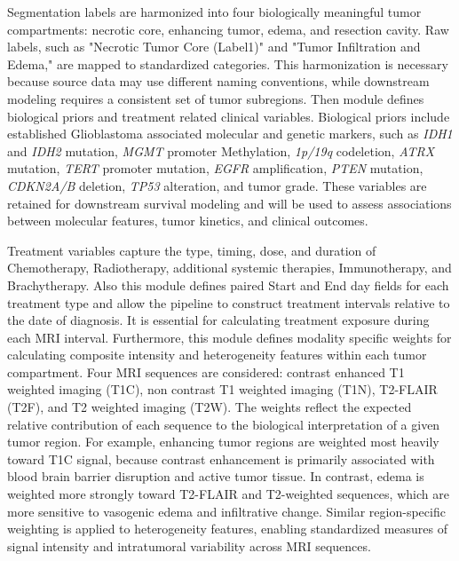 Segmentation labels are harmonized into four biologically meaningful tumor compartments: necrotic core, enhancing tumor, edema, and resection cavity. Raw labels, such as "Necrotic Tumor Core (Label1)" and "Tumor Infiltration and Edema," are mapped to standardized categories. This harmonization is necessary because source data may use different naming conventions, while downstream modeling requires a consistent set of tumor subregions. Then module defines biological priors and treatment related clinical variables. Biological priors include established Glioblastoma associated molecular and genetic markers, such as \textit{IDH1} and \textit{IDH2} mutation, \textit{MGMT} promoter Methylation, \textit{1p/19q} codeletion, \textit{ATRX} mutation, \textit{TERT} promoter mutation, \textit{EGFR} amplification, \textit{PTEN} mutation, \textit{CDKN2A/B} deletion, \textit{TP53} alteration, and tumor grade. These variables are retained for downstream survival modeling and will be used to assess associations between molecular features, tumor kinetics, and clinical outcomes.

Treatment variables capture the type, timing, dose, and duration of Chemotherapy, Radiotherapy, additional systemic therapies, Immunotherapy, and Brachytherapy. Also this module defines paired Start and End day fields for each treatment type and allow the pipeline to construct treatment intervals relative to the date of diagnosis. It is essential for calculating treatment exposure during each MRI interval. Furthermore, this module defines modality specific weights for calculating composite intensity and heterogeneity features within each tumor compartment. Four MRI sequences are considered: contrast enhanced T1 weighted imaging (T1C), non contrast T1 weighted imaging (T1N), T2-FLAIR (T2F), and T2 weighted imaging (T2W). The weights reflect the expected relative contribution of each sequence to the biological interpretation of a given tumor region. For example, enhancing tumor regions are weighted most heavily toward T1C signal, because contrast enhancement is primarily associated with blood brain barrier disruption and active tumor tissue\cite{fan2024radiomics}. In contrast, edema is weighted more strongly toward T2-FLAIR and T2-weighted sequences, which are more sensitive to vasogenic edema and infiltrative change. Similar region-specific weighting is applied to heterogeneity features, enabling standardized measures of signal intensity and intratumoral variability across MRI sequences.

